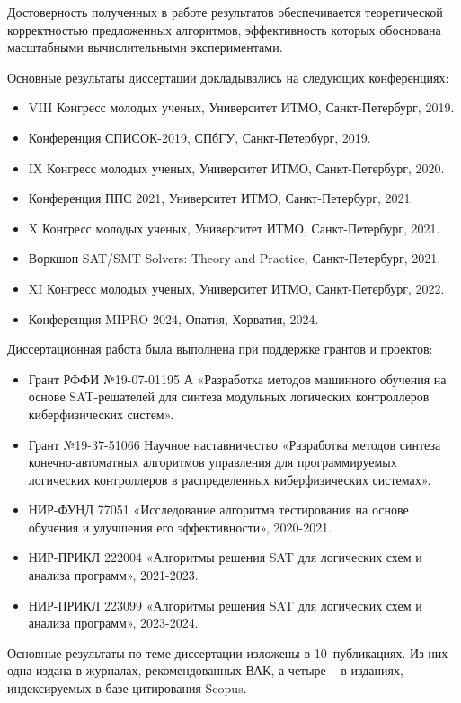 {\reliability}
%
Достоверность полученных в работе результатов обеспечивается теоретической корректностью предложенных алгоритмов, эффективность которых обоснована масштабными вычислительными экспериментами.


\probation
%
Основные результаты диссертации докладывались на следующих конференциях:
\begin{itemize}[beginpenalty=10000]
    \item VIII Конгресс молодых ученых, Университет ИТМО, Санкт-Петербург, 2019.
    \item Конференция СПИСОК-2019, СПбГУ, Санкт-Петербург, 2019.
    \item IX Конгресс молодых ученых, Университет ИТМО, Санкт-Петербург, 2020.
    \item Конференция ППС 2021, Университет ИТМО, Санкт-Петербург, 2021.
    \item X Конгресс молодых ученых, Университет ИТМО, Санкт-Петербург, 2021.
    \item Воркшоп SAT/SMT Solvers: Theory and Practice, Санкт-Петербург, 2021.
    \item XI Конгресс молодых ученых, Университет ИТМО, Санкт-Петербург, 2022.
    \item Конференция MIPRO 2024, Опатия, Хорватия, 2024.
\end{itemize}
%
Диссертационная работа была выполнена при поддержке грантов и проектов:
\begin{itemize}[beginpenalty=10000]
    \item Грант РФФИ №19-07-01195 А «Разработка методов машинного обучения на основе SAT-решателей для синтеза модульных логических контроллеров киберфизических систем».
    \item Грант №19-37-51066 Научное наставничество «Разработка методов синтеза конечно-автоматных алгоритмов управления для программируемых логических контроллеров в распределенных киберфизических системах».
    \item НИР-ФУНД 77051 «Исследование алгоритма тестирования на основе обучения и улучшения его эффективности», 2020-2021.
    \item НИР-ПРИКЛ 222004 «Алгоритмы решения SAT для логических схем и анализа программ», 2021-2023.
    \item НИР-ПРИКЛ 223099 «Алгоритмы решения SAT для логических схем и анализа программ», 2023-2024.
\end{itemize}


\publications
%
%
Основные результаты по теме диссертации изложены в 10~публикациях.
Из них одна издана в журналах, рекомендованных ВАК,
а четыре \--- в изданиях, индексируемых в базе цитирования Scopus.

